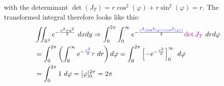 with the determinant $\det(J_T) = r\cos^2(\varphi) + r\sin^2(\varphi) = r$.
The transformed integral therefore looks like this:
\begin{align*}
	& \iint_{\mathbb{R}^2}e^{-\frac{x^2+y^2}{2}}\ dxdy \Rightarrow
	\int_0^{2\pi}\int_0^\infty e^{-\frac{\color{blue}r^2(\sin^2(\varphi)+\cos^2(\varphi))}{2}}{\color{purple}\det J_T}\ drd\varphi \\
	& = \int_0^{2\pi}\left(\int_0^\infty e^{-\frac{\color{blue}r^2}{2}}{\color{purple}r}\ dr\right)d\varphi 
	= \int_0^{2\pi} \left[ -e^{-\frac{r^2}{2}} \right]^\infty_0\ d\varphi \\
	& = \int_0^{2\pi} 1\ d\varphi = [\varphi]^{2\pi}_0 = 2\pi
\end{align*}
